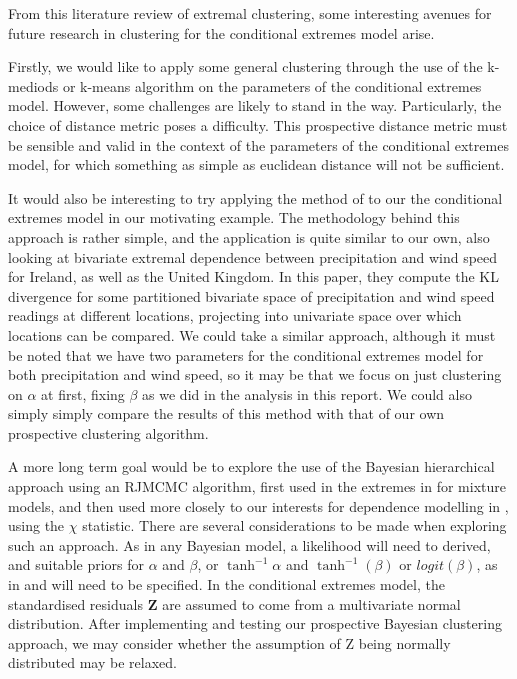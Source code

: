 \documentclass{article}
\numberwithin{equation}{section}
\begin{document}
From this literature review of extremal clustering, some interesting avenues for future research in clustering for the conditional extremes model arise. 

Firstly, we would like to apply some general clustering through the use of the k-mediods or k-means algorithm on the parameters of the conditional extremes model. 
However, some challenges are likely to stand in the way. 
Particularly, the choice of distance metric poses a difficulty. 
This prospective distance metric must be sensible and valid in the context of the parameters of the conditional extremes model, for which something as simple as euclidean distance will not be sufficient.

It would also be interesting to try applying the method of \cite{Vignotto2021} to our the conditional extremes model in our motivating example. 
The methodology behind this approach is rather simple, and the application is quite similar to our own, also looking at bivariate extremal dependence between precipitation and wind speed for Ireland, as well as the United Kingdom.
In this paper, they compute the KL divergence for some partitioned bivariate space of precipitation and wind speed readings at different locations, projecting into univariate space over which locations can be compared. 
We could take a similar approach, although it must be noted that we have two parameters for the conditional extremes model for both precipitation and wind speed, so it may be that we focus on just clustering on $\alpha$ at first, fixing $\beta$ as we did in the analysis in this report. 
We could also simply simply compare the results of this method with that of our own prospective clustering algorithm.

A more long term goal would be to explore the use of the Bayesian hierarchical approach using an RJMCMC algorithm, first used in the extremes in \citet{Bottolo2003} for mixture models, and then used more closely to our interests for dependence modelling in \citet{Rohrbeck2021}, using the $\chi$ statistic.
There are several considerations to be made when exploring such an approach. 
As in any Bayesian model, a likelihood will need to derived, and suitable priors for $\alpha$ and $\beta$, or $\tanh^{-1}{\alpha}$ and $\tanh^{-1}(\beta)$ or $logit(\beta)$, as in \citet{Winter2016} and \cite{Richards2023} will need to be specified. 
In the conditional extremes model, the standardised residuals $\bm{Z}$ are assumed to come from a multivariate normal distribution. 
After implementing and testing our prospective Bayesian clustering approach, we may consider whether the assumption of Z being normally distributed may be relaxed.
\end{document}
